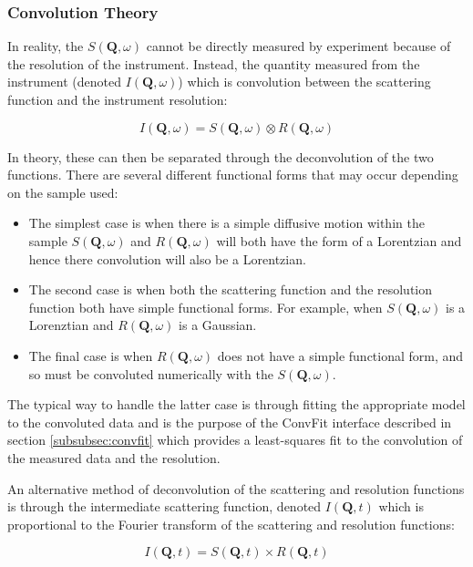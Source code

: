\documentclass[paper=a4, fontsize=11pt]{scrartcl}	%
\numberwithin{equation}{section}															%
\numberwithin{figure}{section}																%
\numberwithin{table}{section}																%
\begin{document}
\subsubsection{Convolution Theory}
In reality, the $S(\mathbf{Q}, \omega)$ cannot be directly measured by experiment because of the resolution of the instrument. Instead, the quantity measured from the instrument (denoted $I(\mathbf{Q}, \omega)$) which is convolution between the scattering function and the instrument resolution:

\begin{equation}
I(\mathbf{Q}, \omega) = S(\mathbf{Q}, \omega) \otimes R(\mathbf{Q}, \omega)
\end{equation}

In theory, these can then be separated through the deconvolution of the two functions. There are several different functional forms that may occur depending on the sample used:

\begin{itemize}
\item The simplest case is when there is a simple diffusive motion within the sample $S(\mathbf{Q},\omega)$ and $R(\mathbf{Q},\omega)$ will both have the form of a Lorentzian and hence there convolution will also be a Lorentzian.

\item The second case is when both the scattering function and the resolution function both have simple functional forms. For example, when $S(\mathbf{Q},\omega)$ is a Lorenztian and $R(\mathbf{Q},\omega)$ is a Gaussian.

\item The final case is when $R(\mathbf{Q}, \omega)$ does not have a simple functional form, and so must be convoluted numerically with the $S(\mathbf{Q}, \omega)$.
\end{itemize}

The typical way to handle the latter case is through fitting the appropriate model to the convoluted data and is the purpose of the ConvFit interface described in section \ref{subsubsec:convfit} which provides a least-squares fit to the convolution of the measured data and the resolution.

An alternative method of deconvolution of the scattering and resolution functions is through the intermediate scattering function, denoted $I(\mathbf{Q}, t)$ which is proportional to the Fourier transform of the scattering and resolution functions:

\begin{equation}
I(\mathbf{Q}, t) = S(\mathbf{Q}, t) \times R(\mathbf{Q}, t)
\end{equation}
\end{document}
